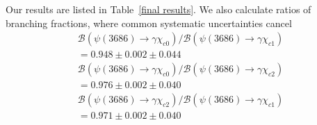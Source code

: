\documentclass[aps,prd,twocolumn,showpacs,floatfix,byrevtex]{revtex4-1}
\begin{document}
Our results are listed in Table~\ref{final results}.  We also
calculate ratios of branching fractions, where common systematic
uncertainties cancel
\begin{eqnarray}
 \mathcal{B}(\psi(3686) \to \gamma \chi_{c0})/\mathcal{B}(\psi(3686) \to \gamma
\chi_{c1}) \nonumber \\ 
= 0.948 \pm 0.002 \pm 0.044 \nonumber \\
 \mathcal{B}(\psi(3686) \to \gamma \chi_{c0})/\mathcal{B}(\psi(3686) \to \gamma
\chi_{c2}) \nonumber \\
= 0.976 \pm 0.002 \pm 0.040 \nonumber \\ 
 \mathcal{B}(\psi(3686) \to \gamma \chi_{c2})/\mathcal{B}(\psi(3686) \to \gamma
\chi_{c1})  \nonumber \\
= 0.971 \pm 0.002 \pm 0.040 \nonumber
\end{eqnarray}
\end{document}
